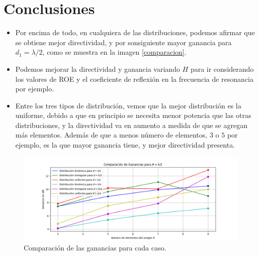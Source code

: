 \documentclass[11pt]{report}
\begin{document}
\newpage

\section{Conclusiones}

\begin{itemize}
	\item Por encima de todo, en cualquiera de las distribuciones, podemos afirmar que se obtiene mejor directividad, y por sonsiguiente mayor ganancia para $d_1=\lambda/2$, como se muestra en la imagen \eqref{comparacion}.
	\item Podemos mejorar la directividad y ganancia variando $H$ para ir considerando los valores de ROE y el coeficiente de reflexión en la frecuencia de resonancia por ejemplo.
	\item Entre los tres tipos de distribución, vemos que la mejor distribución es la uniforme, debido a que en principio se necesita menor potencia que las otras distribuciones, y la directividad va en aumento a medida de que se agregan más elementos. Además de que a menos número de elementos, $3$ o $5$ por ejemplo, es la que mayor ganancia tiene, y mejor directividad presenta.
\end{itemize}

\begin{figure}[h!]
	\centering
	\includegraphics[scale=0.6]{IMAGENES/comparacion}
	\caption{Comparación de las ganancias para cada caso.}
	\label{comparacion}
\end{figure}


	
\end{document}

